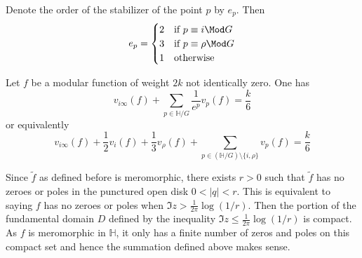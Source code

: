 \documentclass[12pt]{article}
\theoremstyle{definition}
\begin{document}
Denote the order of the stabilizer of the point \(p\) by \(e_p\). Then 
\[
    e_p = \begin{cases}
        2 & \text{if } p \equiv i \Mod G\\
        3 & \text{if } p \equiv \rho  \Mod G\\
        1 & \text{otherwise}
    \end{cases}
\] 
\begin{thm}[label=val]
Let \(f\) be a modular function of weight \(2k\) not identically zero. One has
\[
    v_{i\infty } (f) + \sum_{p\in \mathbb{H}/G} \frac{1}{e^p}v_p(f) = \frac{k}{6} 
\]
or equivalently
\[
    v_{i\infty }(f) + \frac{1}{2}v_i(f) + \frac{1}{3}v_{\rho }(f) + \sum_{p \in (\mathbb{H}/G)\setminus \{i,\rho   \} } v_p(f)=\frac{k}{6}  
\]
\end{thm}
Since \(\widetilde{f} \) as defined before is meromorphic, there exists \(r>0\) such that \(\widetilde{f} \) has no zeroes or poles in the punctured open disk \(0<\vert q \vert <r\). This is equivalent to saying \(f\) has no zeroes or poles when \(\Im z > \frac{1}{2\pi }\log (1/r)\). Then the portion of the fundamental domain \(D\) defined by the inequality \(\Im z \leq \frac{1}{2\pi }\log (1/r)\) is compact. As \(f\) is meromorphic in \(\mathbb{H}\), it only has a finite number of zeros and poles on this compact set and hence the summation defined above makes sense.
\newpage
\end{document}
